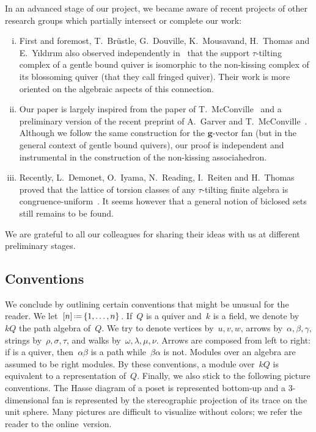 \documentclass{amsart}
\theoremstyle{definition}
\renewcommand{\b}[1]{\mathbf{#1}} %
\newcommand{\eqdef}{\mbox{\,\raisebox{0.2ex}{\scriptsize\ensuremath{\mathrm:}}\ensuremath{=}\,}} %
\begin{document}
In an advanced stage of our project, we became aware of recent projects of other research groups which partially intersect or complete our work:
\begin{enumerate}[(i)]
\item First and foremost, T.~Br\"ustle, G.~Douville, K.~Mousavand, H.~Thomas and E.~Y\i{}ld\i{}r\i{}m also observed independently in~\cite{BrustleDouvilleMousavandThomasYildirim} that the support $\tau$-tilting complex of a gentle bound quiver is isomorphic to the non-kissing complex of its blossoming quiver (that they call fringed quiver). Their work is more oriented on the algebraic aspects of this connection.
\item Our paper is largely inspired from the paper of T.~McConville~\cite{McConville} and a preliminary version of the recent preprint of A.~Garver and T.~McConville~\cite{GarverMcConville-grid}. Although we follow the same construction for the $\b{g}$-vector fan (but in the general context of gentle bound quivers), our proof is independent and instrumental in the construction of the non-kissing associahedron.
\item Recently, L.~Demonet, O.~Iyama, N.~Reading, I.~Reiten and H.~Thomas proved that the lattice of torsion classes of any $\tau$-tilting finite algebra is congruence-uniform~\cite{DemonetIyamaReadingReitenThomas}. It seems however that a general notion of biclosed sets still remains to be found.
\end{enumerate}
We are grateful to all our colleagues for sharing their ideas with us at different preliminary stages.

\subsection*{Conventions}

We conclude by outlining certain conventions that might be unusual for the reader.
%
We let~$[n] \eqdef \{1, \dots, n\}$.
%
If~$Q$ is a quiver and~$k$ is a field, we denote by~$kQ$ the path algebra of~$Q$.
We try to denote vertices by~$u,v,w$, arrows by~$\alpha, \beta, \gamma$, strings by~$\rho, \sigma, \tau$, and walks by~$\omega, \lambda, \mu, \nu$.
Arrows are composed from left to right: if  is a quiver, then~$\alpha\beta$ is a path while~$\beta\alpha$ is not.
Modules over an algebra are assumed to be right modules.
By these conventions, a module over~$kQ$ is equivalent to a representation of~$Q$.
%
Finally, we also stick to the following picture conventions.
The Hasse diagram of a poset is represented bottom-up and a $3$-dimensional fan is represented by the stereographic projection of its trace on the unit sphere.
Many pictures are difficult to visualize without colors; we refer the reader to the online~version.
\end{document}
